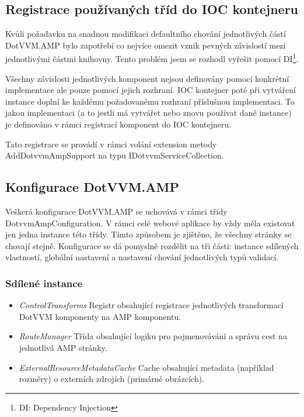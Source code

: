 \subsection*{Registrace používaných tříd do IOC kontejneru}

Kvůli požadavku na snadnou modifikaci defaultního chování jednotlivých částí DotVVM.AMP bylo zapotřebí co nejvíce omezit vznik pevných závislostí mezi jednotlivými částmi knihovny. Tento problém jsem se rozhodl vyřešit pomocí DI\footnote{\label{DI}DI: Dependency Injection}.

Všechny závislosti jednotlivých komponent nejsou definovány pomocí konkrétní implementace ale pouze pomocí jejich rozhraní. IOC kontejner poté při vytváření instance doplní ke každému požadovanému rozhraní příslušnou implementaci. To jakou implementaci (a to jestli má vytvářet nebo znovu používat dané instance) je definováno v rámci registrací komponent do IOC kontejneru.

Tato registrace se provádí v rámci volání extension metody AddDotvvmAmpSupport na typu IDotvvmServiceCollection.

\subsection*{Konfigurace DotVVM.AMP}
Veškerá konfigurace DotVVM.AMP se uchovává v rámci třídy DotvvmAmpConfiguration. V rámci celé webové aplikace by vždy měla existovat jen jedna instance této třídy. Tímto způsobem je zjištěno, že všechny stránky se chovají stejně. Konfigurace se dá pomyslně rozdělit na tři části: instance sdílených vlastností, globální nastavení a nastavení chování jednotlivých typů validací.

\subsubsection{Sdílené instance}
\begin{itemize}
    \item \textit{ControlTransforms} \newline
Registr obsahující registrace jednotlivých transformací DotVVM komponenty na AMP komponentu.
    \item \textit{RouteManager}\newline
Třída obsahující logiku pro pojmenovávání a správu cest na jednotlivá AMP stránky.
    \item \textit{ExternalResourceMetadataCache}\newline
Cache obsahující metadata (například rozměry) o externích zdrojích (primárně obrázcích).
\end{itemize}

